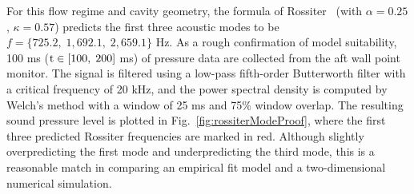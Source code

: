 For this flow regime and cavity geometry, the formula of Rossiter~\cite{Rossiter1964} (with $\alpha = 0.25$, $\kappa = 0.57$) predicts the first three acoustic modes to be $f = \{725.2, \; 1,692.1, \; 2,659.1\}$ Hz. As a rough confirmation of model suitability, 100 ms ($\text{t} \in [100, \; 200]$ ms) of pressure data are collected from the aft wall point monitor. The signal is filtered using a low-pass fifth-order Butterworth filter with a critical frequency of 20 kHz, and the power spectral density is computed by Welch's method with a window of 25 ms and 75\% window overlap. The resulting sound pressure level is plotted in Fig.~\ref{fig:rossiterModeProof}, where the first three predicted Rossiter frequencies are marked in red. Although slightly overpredicting the first mode and underpredicting the third mode, this is a reasonable match in comparing an empirical fit model and a two-dimensional numerical simulation.

